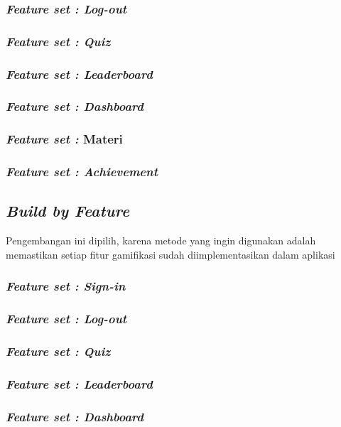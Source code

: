 \subsubsection{\textit{Feature set : Log-out}}
\subsubsection{\textit{Feature set : Quiz}}
\subsubsection{\textit{Feature set : Leaderboard} }
\subsubsection{\textit{Feature set : Dashboard}}
\subsubsection{\textit{Feature set :} Materi}
\subsubsection{\textit{Feature set : Achievement}}

\subsection{\textit{Build by Feature}}
Pengembangan ini dipilih, karena metode yang ingin digunakan adalah memastikan setiap fitur gamifikasi sudah diimplementasikan dalam aplikasi
\subsubsection{\textit{Feature set : Sign-in}}
\subsubsection{\textit{Feature set : Log-out}}
\subsubsection{\textit{Feature set : Quiz}}
\subsubsection{\textit{Feature set : Leaderboard} }
\subsubsection{\textit{Feature set : Dashboard}}
